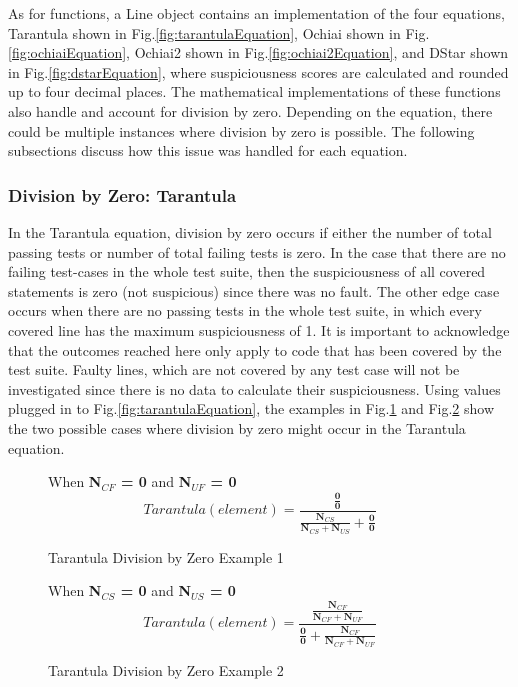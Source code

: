As for functions, a Line object contains an implementation of the four
equations, Tarantula shown in Fig.\ref{fig:tarantulaEquation}, Ochiai shown in
Fig.\ref{fig:ochiaiEquation}, Ochiai2 shown in Fig.\ref{fig:ochiai2Equation},
and DStar shown in Fig.\ref{fig:dstarEquation},
where suspiciousness scores are calculated and rounded up to four decimal places.
The mathematical implementations of these functions also handle and account for
division by zero. Depending on the equation, there could be multiple instances
where division by zero is possible. The following subsections discuss how this
issue was handled for each equation.

\subsubsection{Division by Zero: Tarantula}
\label{subsubsec:div_by_zero_taran}
In the Tarantula equation, division by zero occurs if either the number of
total passing tests or number of total failing tests is zero. In the case that
there are no failing test-cases in the whole test suite, then the suspiciousness
of all covered statements is zero (not suspicious) since there was no fault. The
other edge case occurs when there are no passing tests in the whole test suite,
in which every covered line has the maximum suspiciousness of 1. It is important
to acknowledge that the outcomes reached here only apply to code that has been
covered by the test suite. Faulty lines, which are not covered by any test case
will not be investigated since there is no data to calculate their
suspiciousness. Using values plugged in to Fig.\ref{fig:tarantulaEquation}, the
examples in Fig.\ref{fig:taran_div_by_zero_1} and Fig.\ref{fig:taran_div_by_zero_2} show
the two possible cases where division by zero might occur in the Tarantula
equation.

\begin{figure}[!htb]
	\begin{center}
        When \textbf{N$_{CF}$ = 0} and \textbf{N$_{UF}$ = 0 }
		\begin{equation}
			Tarantula(element) = \frac{\frac{\textbf{0}}{\textbf{0}}}{\frac{\textbf{N$_{CS}$}}{\textbf{N$_{CS}$}+\textbf{N$_{US}$}} + \frac{\textbf{0}}{\textbf{0}}}
		\end{equation}
		\caption{\label{fig:taran_div_by_zero_1} Tarantula Division by Zero Example 1}
	\end{center}
\end{figure}

\begin{figure}[!htb]
	\begin{center}
        When \textbf{N$_{CS}$ = 0} and \textbf{N$_{US}$ = 0 }
		\begin{equation}
			Tarantula(element) = \frac{\frac{\textbf{N$_{CF}$}}{\textbf{N$_{CF}$} + \textbf{N$_{UF}$}}}{\frac{\textbf{0}}{\textbf{0}} + \frac{\textbf{N$_{CF}$}}{\textbf{N$_{CF}$}+\textbf{N$_{UF}$}}}
		\end{equation}
		\caption{\label{fig:taran_div_by_zero_2} Tarantula Division by Zero Example 2}
	\end{center}
\end{figure}

